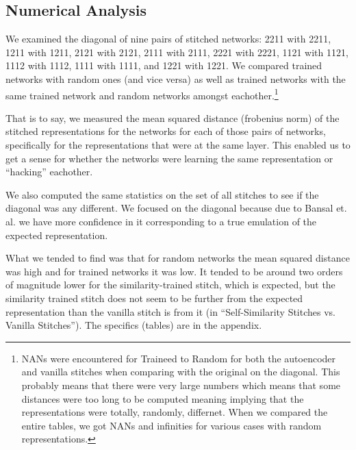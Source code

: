 \documentclass{article} %
\begin{document}
\subsection*{Numerical Analysis}
We examined the diagonal of nine pairs of stitched networks: 2211 with 2211, 1211 with 1211, 
2121 with 2121, 2111 with 2111, 2221 with 2221, 1121 with 1121, 1112 with 1112, 1111 with 1111, 
and 1221 with 1221. We compared trained networks with random ones (and vice versa) as well as trained
networks with the same trained network and random networks amongst eachother.\footnote{NANs were encountered for 
Traineed to Random for both the autoencoder and vanilla stitches when comparing with the original on the diagonal.
This probably means  that there were
very large numbers which means that some distances were too long to be computed meaning implying that
the representations were totally, randomly, differnet. When we compared the entire tables, we got NANs and infinities
for various cases with random representations.}

That is to say, we measured the mean squared distance (frobenius norm) of the stitched representations for the networks
for each of those pairs of networks, specifically for the representations that were at the same layer. This enabled us
to get a sense for whether the networks were learning the same representation or ``hacking'' eachother.

We also computed the same statistics on the set of all stitches to see if the diagonal was any different. We focused
on the diagonal because due to Bansal et. al. we have more confidence in it corresponding to a true emulation of the
expected representation.

What we tended to find was that for random networks the mean squared distance was high and for trained networks it was
low. It tended to be around two orders of magnitude lower for the similarity-trained stitch, which is expected, but the
similarity trained stitch does not seem to be further from the expected representation than the vanilla stitch is from it
(in ``Self-Similarity Stitches vs. Vanilla Stitches''). The specifics (tables) are in the appendix.
   
\end{document}
